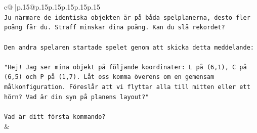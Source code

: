 \documentclass{article}
\begin{document}
{\begin{supertabular}{c@{$\;$}|p{.15\linewidth}@{}p{.15\linewidth}p{.15\linewidth}p{.15\linewidth}p{.15\linewidth}p{.15\linewidth}}
{{{\\ 
\texttt{Ju närmare de identiska objekten är på båda spelplanerna, desto fler poäng får du. Straff minskar dina poäng. Kan du slå rekordet?} \\
\\ 
\texttt{Den andra spelaren startade spelet genom att skicka detta meddelande:} \\
\\ 
\texttt{"Hej! Jag ser mina objekt på följande koordinater: L på (6,1), C på (6,5) och P på (1,7). Låt oss komma överens om en gemensam målkonfiguration. Föreslår att vi flyttar alla till mitten eller ett hörn? Vad är din syn på planens layout?"} \\
\\ 
\texttt{Vad är ditt första kommando?} \\
            }
        }
    }
    & \\ \\


\end{supertabular}}
\end{document}

